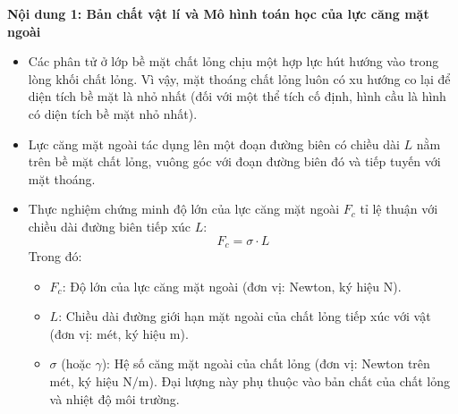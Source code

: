 \documentclass[12pt, a4paper]{article}
\begin{document}
\noindent \textbf{Nội dung 1: Bản chất vật lí và Mô hình toán học của lực căng mặt ngoài}
\begin{itemize}
    \item Các phân tử ở lớp bề mặt chất lỏng chịu một hợp lực hút hướng vào trong lòng khối chất lỏng. Vì vậy, mặt thoáng chất lỏng luôn có xu hướng co lại để diện tích bề mặt là nhỏ nhất (đối với một thể tích cố định, hình cầu là hình có diện tích bề mặt nhỏ nhất).
    \item Lực căng mặt ngoài tác dụng lên một đoạn đường biên có chiều dài $L$ nằm trên bề mặt chất lỏng, vuông góc với đoạn đường biên đó và tiếp tuyến với mặt thoáng.
    \item Thực nghiệm chứng minh độ lớn của lực căng mặt ngoài $F_c$ tỉ lệ thuận với chiều dài đường biên tiếp xúc $L$:
    \begin{equation}
        F_c = \sigma \cdot L
    \end{equation}
    Trong đó:
    \begin{itemize}
        \item $F_c$: Độ lớn của lực căng mặt ngoài (đơn vị: Newton, ký hiệu $\text{N}$).
        \item $L$: Chiều dài đường giới hạn mặt ngoài của chất lỏng tiếp xúc với vật (đơn vị: mét, ký hiệu $\text{m}$).
        \item $\sigma$ (hoặc $\gamma$): Hệ số căng mặt ngoài của chất lỏng (đơn vị: Newton trên mét, ký hiệu $\text{N/m}$). Đại lượng này phụ thuộc vào bản chất của chất lỏng và nhiệt độ môi trường.
    \end{itemize}
\end{itemize}
\end{document}
